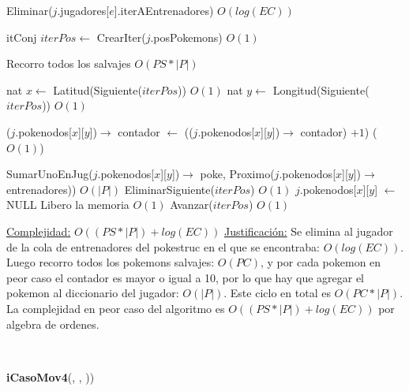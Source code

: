 \begin{Algoritmos}
\begin{algorithmic}[1]
$ $\newline


\State Eliminar($j$.jugadores[$e$].iterAEntrenadores) \Comment $O(log(EC))$

\State itConj $iterPos \gets$ CrearIter($j$.posPokemons) \Comment $O(1)$ 

 Recorro todos los salvajes \Comment $O(PS * |P|)$

	\State nat $x \gets$ Latitud(Siguiente($iterPos$)) \Comment $O(1)$
	\State nat $y \gets$ Longitud(Siguiente($iterPos$)) \Comment $O(1)$		
	
	\State ($j$.pokenodos[$x$][$y$])$\rightarrow$ contador $\gets$ (($j$.pokenodos[$x$][$y$])$\rightarrow$ contador) $+ 1$) \Comment($O(1)$)
	
		\State SumarUnoEnJug($j$.pokenodos[$x$][$y$])$\rightarrow$ poke, Proximo($j$.pokenodos[$x$][$y$])$\rightarrow$ entrenadores)) \Comment $O(|P|)$
		\State EliminarSiguiente($iterPos$) \Comment $O(1)$
		\State $j$.pokenodos[$x$][$y$] $\gets$ NULL \Comment Libero la memoria $O(1)$
	\Else 
		\State Avanzar($iterPos$)	\Comment $O(1)$	
	\EndIf

\EndWhile 



\medskip
\Statex \underline{Complejidad:} $O((PS *|P|) + log(EC))$ 
\Statex \underline{Justificaci\'on:} Se elimina al jugador de la cola de entrenadores del pokestruc en el que se encontraba: $O(log(EC))$. Luego recorro todos los pokemons salvajes: $O(PC)$, y por cada pokemon en peor caso el contador es mayor o igual a 10, por lo que hay que agregar el pokemon al diccionario del jugador: $O(|P|)$. Este ciclo en total es $O(PC*|P|)$. La complejidad en peor caso del algoritmo es $O((PS *|P|) + log(EC))$ por algebra de ordenes.
\end{algorithmic}

$ $\newline
$ $\newline



{\textbf{iCasoMov4}(,  , ))}
\begin{algorithmic}[1]


\end{algorithmic}
\end{Algoritmos}
